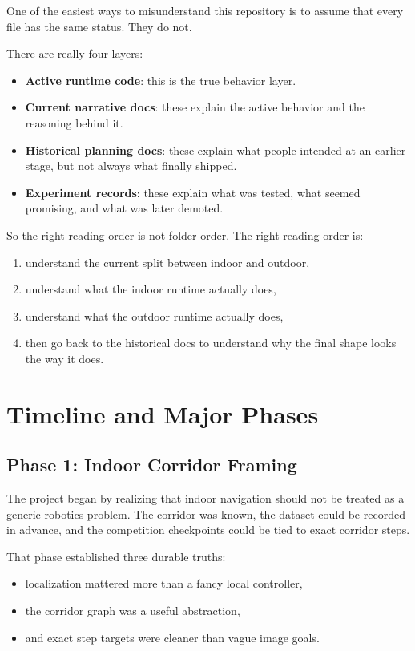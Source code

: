 \documentclass[11pt]{article}
\begin{document}
One of the easiest ways to misunderstand this repository is to assume that every
file has the same status. They do not.

There are really four layers:

\begin{itemize}[nosep]
  \item \textbf{Active runtime code}: this is the true behavior layer.
  \item \textbf{Current narrative docs}: these explain the active behavior and the
  reasoning behind it.
  \item \textbf{Historical planning docs}: these explain what people intended at an
  earlier stage, but not always what finally shipped.
  \item \textbf{Experiment records}: these explain what was tested, what seemed
  promising, and what was later demoted.
\end{itemize}

So the right reading order is not folder order. The right reading order is:

\begin{enumerate}[nosep]
  \item understand the current split between indoor and outdoor,
  \item understand what the indoor runtime actually does,
  \item understand what the outdoor runtime actually does,
  \item then go back to the historical docs to understand why the final shape looks
  the way it does.
\end{enumerate}

\section{Timeline and Major Phases}

\subsection{Phase 1: Indoor Corridor Framing}

The project began by realizing that indoor navigation should not be treated as a
generic robotics problem. The corridor was known, the dataset could be recorded in
advance, and the competition checkpoints could be tied to exact corridor steps.

That phase established three durable truths:

\begin{itemize}[nosep]
  \item localization mattered more than a fancy local controller,
  \item the corridor graph was a useful abstraction,
  \item and exact step targets were cleaner than vague image goals.
\end{itemize}
\end{document}
